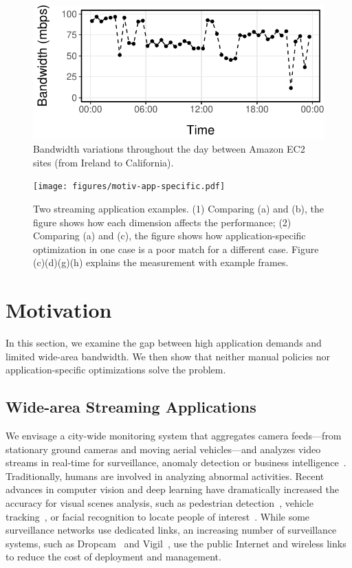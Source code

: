 \begin{figure}
  \centering
  \includegraphics[width=.9\linewidth]{figures/aws-variation.pdf}
  \caption{Bandwidth variations throughout the day between Amazon EC2 sites
    (from Ireland to California).}
  \label{fig:bw}
\end{figure}

\begin{figure}
  \centering
  \texttt{[image: figures/motiv-app-specific.pdf]}
  \caption{Two streaming application examples. (1) Comparing (a) and (b), the
    figure shows how each dimension affects the performance; (2) Comparing (a)
    and (c), the figure shows how application-specific optimization in one case
    is a poor match for a different case. Figure (c)(d)(g)(h) explains the
    measurement with example frames.}
  \label{fig:app-specific}
\end{figure}

\section{Motivation}
\label{sec:motivation}

In this section, we examine the gap between high application demands and limited
wide-area bandwidth. We then show that neither manual policies nor
application-specific optimizations solve the problem.

\subsection{Wide-area Streaming Applications}
\label{sec:wide-area-streaming}

 We envisage a city-wide monitoring system that
aggregates camera feeds---from stationary ground cameras and moving aerial
vehicles---and analyzes video streams in real-time for surveillance, anomaly
detection or business intelligence~\cite{oh2011large}. Traditionally, humans are
involved in analyzing abnormal activities. Recent advances in computer vision
and deep learning have dramatically increased the accuracy for visual scenes
analysis, such as pedestrian detection~\cite{dollar2012pedestrian}, vehicle
tracking~\cite{coifman1998real}, or facial recognition to locate people of
interest~\cite{parkhi2015deep, Lu:2015:SHF:2888116.2888245}. While some
surveillance networks use dedicated links, an increasing number of surveillance
systems, such as Dropcam~\cite{dropcam} and Vigil~\cite{zhang2015design}, use
the public Internet and wireless links to reduce the cost of deployment and
management.

